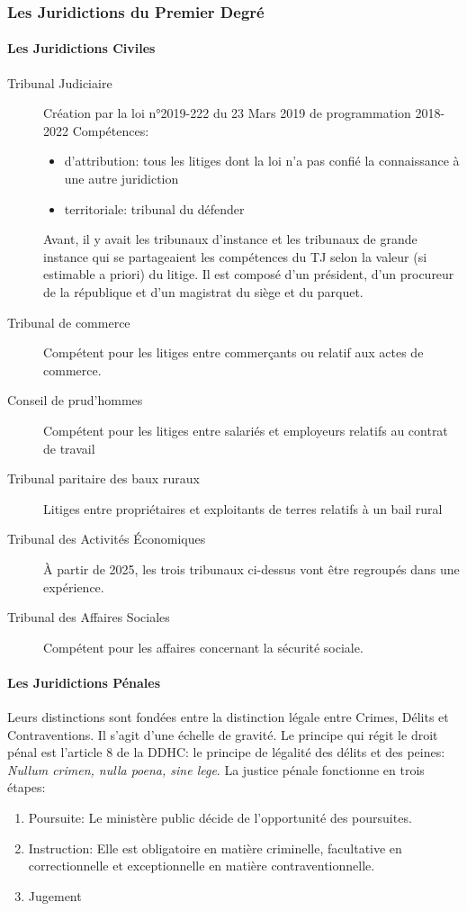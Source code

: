 \documentclass[math]{cours}
\begin{document}
\subsubsection{Les Juridictions du Premier Degré}
\paragraph{Les Juridictions Civiles}
\begin{description}
	\item[Tribunal Judiciaire] Création par la loi n°2019-222 du 23 Mars 2019 de programmation 2018-2022
	      Compétences:
	      \begin{itemize}
		      \item d'attribution:
		            tous les litiges dont la loi n'a pas confié la connaissance à une autre juridiction
		      \item territoriale:
		            tribunal du défender
	      \end{itemize}
	      Avant, il y avait les tribunaux d'instance et les tribunaux de grande instance qui se partageaient les compétences du TJ selon la valeur (si estimable a priori) du litige.
	      Il est composé d'un président, d'un procureur de la république et d'un magistrat du siège et du parquet.
	\item[Tribunal de commerce] Compétent pour les litiges entre commerçants ou relatif aux actes de commerce.
	\item[Conseil de prud'hommes] Compétent pour les litiges entre salariés et employeurs relatifs au contrat de travail
	\item[Tribunal paritaire des baux ruraux] Litiges entre propriétaires et exploitants de terres relatifs à un bail rural
	\item[Tribunal des Activités Économiques] À partir de 2025, les trois tribunaux ci-dessus vont être regroupés dans une expérience.
	\item[Tribunal des Affaires Sociales] Compétent pour les affaires concernant la sécurité sociale.
\end{description}

\paragraph{Les Juridictions Pénales}
Leurs distinctions sont fondées entre la distinction légale entre Crimes, Délits et Contraventions.
Il s'agit d'une échelle de gravité.
Le principe qui régit le droit pénal est l'article 8 de la DDHC: le principe de légalité des délits et des peines: \textit{Nullum crimen, nulla poena, sine lege}.
La justice pénale fonctionne en trois étapes:
\begin{enumerate}
	\item Poursuite: Le ministère public décide de l'opportunité des poursuites.
	\item Instruction: Elle est obligatoire en matière criminelle, facultative en correctionnelle et exceptionnelle en matière contraventionnelle.
	\item Jugement
\end{enumerate}
\end{document}
